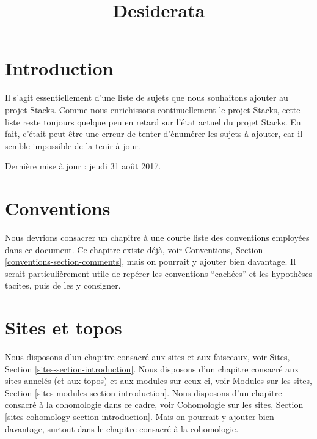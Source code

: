 

%


\title{Desiderata}

\maketitle

\label{section-phantom}


\tableofcontents

\section{Introduction}
\label{section-introduction}

\noindent
Il s'agit essentiellement d'une liste de sujets que nous souhaitons ajouter au
projet Stacks. Comme nous enrichissons continuellement le projet Stacks, cette liste reste
toujours quelque peu en retard sur l'état actuel du projet Stacks. En fait, c'était peut-être
une erreur de tenter d'énumérer les sujets à ajouter, car il semble
impossible de la tenir à jour.

\medskip\noindent
Dernière mise à jour : jeudi 31 août 2017.


\section{Conventions}
\label{section-conventions}

\noindent
Nous devrions consacrer un chapitre à une courte liste des conventions employées dans ce document.
Ce chapitre existe déjà, voir
Conventions, Section \ref{conventions-section-comments},
mais on pourrait y ajouter bien davantage. Il serait particulièrement utile de repérer
les conventions ``cachées'' et les hypothèses tacites, puis de les y consigner.


\section{Sites et topos}
\label{section-sites}

\noindent
Nous disposons d'un chapitre consacré aux sites et aux faisceaux, voir
Sites, Section \ref{sites-section-introduction}.
Nous disposons d'un chapitre consacré aux sites annelés (et aux topos) et aux modules sur ceux-ci, voir
Modules sur les sites, Section \ref{sites-modules-section-introduction}.
Nous disposons d'un chapitre consacré à la cohomologie dans ce cadre, voir
Cohomologie sur les sites, Section \ref{sites-cohomology-section-introduction}.
Mais on pourrait y ajouter bien davantage, surtout dans le chapitre consacré à la cohomologie.


